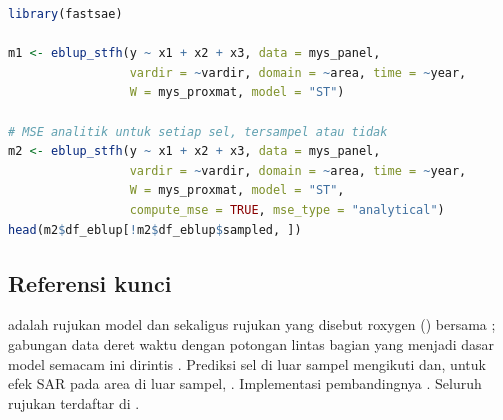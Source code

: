 \begin{lstlisting}[language=R,caption={Contoh yang dapat dijalankan (dari \texttt{man/eblup\_stfh.Rd}); domain 21 dan 25 tidak pernah tersampel.}]
library(fastsae)

m1 <- eblup_stfh(y ~ x1 + x2 + x3, data = mys_panel,
                 vardir = ~vardir, domain = ~area, time = ~year,
                 W = mys_proxmat, model = "ST")

# MSE analitik untuk setiap sel, tersampel atau tidak
m2 <- eblup_stfh(y ~ x1 + x2 + x3, data = mys_panel,
                 vardir = ~vardir, domain = ~area, time = ~year,
                 W = mys_proxmat, model = "ST",
                 compute_mse = TRUE, mse_type = "analytical")
head(m2$df_eblup[!m2$df_eblup$sampled, ])
\end{lstlisting}

\subsection{Referensi kunci}\label{sec:stfh-ref}

\citet{marhuenda2013small} adalah rujukan model dan sekaligus rujukan yang
disebut roxygen () bersama \citet{rao2015small};
gabungan data deret waktu dengan potongan lintas bagian yang menjadi dasar
model semacam ini dirintis \citet{rao1994small}. Prediksi sel di luar sampel
mengikuti \citet{saei2005out} dan, untuk efek SAR pada area di luar sampel,
\citet{benedetti2024handling}. Implementasi pembandingnya 
\citep{molina2015sae}. Seluruh rujukan terdaftar di .
